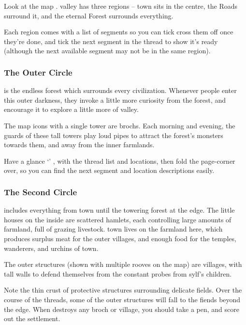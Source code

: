 \begin{multicols}{2}
Look at the map .
\Gls{valley} has three \glspl{region} -- \gls{town} sits in the centre, the Roads surround it, and the eternal Forest surrounds everything.

Each \gls{region} comes with a list of \glspl{segment} so you can tick cross them off once they're done, and tick the next \gls{segment} in the \gls{thread} to show it's ready (although the next available \gls{segment} may not be in the same \gls{region}).

\subsubsection{The Outer Circle}
is the endless forest which surrounds every civilization.
Whenever people enter this outer darkness, they invoke a little more curiosity from the forest, and encourage it to explore a little more of \gls{valley}.

The map icons with a single tower are \glspl{broch}.
Each morning and evening, the \glspl{guard} of these tall towers play loud pipes to attract the forest's \glspl{monster} towards them, and away from the inner farmlands.

Have a glance `' , with the \gls{thread} list and locations, then fold the page-corner over, so you can find the next \gls{segment} and location descriptions easily.

\subsubsection{The Second Circle}
includes everything from \gls{town} until the towering forest at the \gls{edge}.
The little houses on the inside are scattered hamlets, each controlling large amounts of farmland, full of grazing livestock.
\Gls{town} lives on the farmland here, which produces surplus meat for the outer \glspl{village}, and enough food for the \glspl{temple}, wanderers, and urchins of \gls{town}.

The outer structures (shown with multiple rooves on the map) are \glspl{village}, with tall walls to defend themselves from the constant probes from \gls{sylf}'s children.

Note the thin crust of protective structures surrounding delicate fields.
Over the course of the \glspl{thread}, some of the outer structures will fall to the \glspl{fiend} beyond the \gls{edge}.
When  destroys any \gls{broch} or \gls{village}, you should take a pen, and score out the settlement.


\end{multicols}
